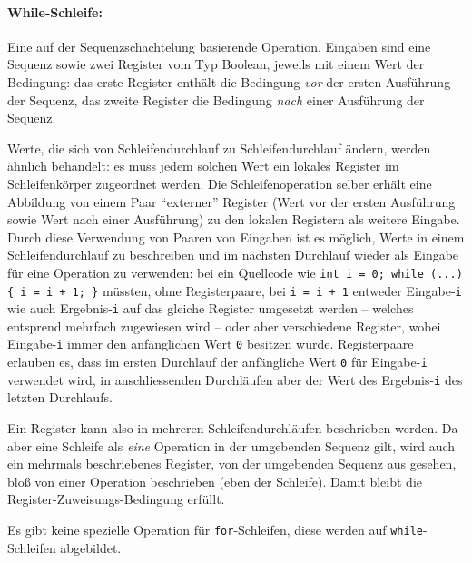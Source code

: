 \documentclass[twoside,a4paper,fleqn,12pt]{book}
\begin{document}
\paragraph{While-Schleife:} Eine auf der Sequenzschachtelung basierende Operation. Eingaben sind eine Sequenz sowie zwei Register vom
Typ Boolean, jeweils mit einem Wert der Bedingung: das erste Register enthält die Bedingung \emph{vor} der ersten Ausführung der Sequenz,
das zweite Register die Bedingung \emph{nach} einer Ausführung der Sequenz.

Werte, die sich von Schleifendurchlauf zu Schleifendurchlauf ändern, werden ähnlich behandelt: es muss jedem solchen Wert ein lokales
Register im Schleifenkörper zugeordnet werden. Die Schleifenoperation selber erhält eine Abbildung von einem Paar "`externer"' Register
(Wert vor der ersten Ausführung sowie Wert nach einer Ausführung) zu den lokalen Registern als weitere Eingabe.
Durch diese Verwendung von Paaren von Eingaben ist es möglich, Werte in einem Schleifendurchlauf zu beschreiben
und im nächsten Durchlauf wieder als Eingabe für eine Operation zu verwenden: bei ein Quellcode wie 
\texttt{int i = 0; while (...) \{ i = i + 1; \}} müssten, ohne Registerpaare, bei \texttt{i = i + 1} entweder Eingabe-\texttt{i}
wie auch Ergebnis-\texttt{i} auf das gleiche Register umgesetzt werden -- welches entsprend mehrfach zugewiesen wird -- oder aber verschiedene Register, wobei
Eingabe-\texttt{i} immer den anfänglichen Wert \texttt{0} besitzen würde. Registerpaare erlauben es, dass im ersten Durchlauf
der anfängliche Wert \texttt{0} für Eingabe-\texttt{i} verwendet wird, in anschliessenden Durchläufen aber der Wert des Ergebnis-\texttt{i}
des letzten Durchlaufs.


Ein Register kann also in mehreren Schleifendurchläufen beschrieben werden.
Da aber eine Schleife als \emph{eine} Operation in der umgebenden Sequenz gilt, wird auch ein mehrmals beschriebenes Register,
von der umgebenden Sequenz aus gesehen, bloß von einer Operation beschrieben (eben der Schleife).
Damit bleibt die Register-Zuweisungs-Bedingung erfüllt.

Es gibt keine spezielle Operation für \texttt{for}-Schleifen, diese werden auf \texttt{while}-Schleifen abgebildet.
\end{document}
